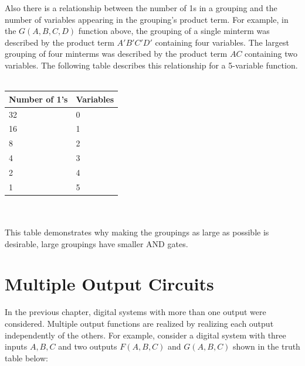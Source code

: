 \begin{process:minimizationKmap}
Also there is a relationship between the number of 1s in a 
grouping and the number of variables appearing in the grouping's
product term.  For example, in the $G(A,B,C,D)$ function
above, the grouping of a single minterm was described by the
product term $A'B'C'D'$ containing four variables.  The largest
grouping of four  minterms was described by the product term
$AC$ containing two variables.  The following table describes 
this relationship for a 5-variable function.
\\ \\
\begin{tabular}{l|l}
Number of 1's	& Variables  \\ \hline
32		&	0	\\ \hline
16		&	1	\\ \hline
8		&	2	\\ \hline
4		&	3	\\ \hline
2		&	4	\\ \hline
1		&	5	\\ 
\end{tabular}
\\ \\
This table demonstrates why making the groupings as large
as possible is desirable, large groupings have smaller AND gates.

\section{Multiple Output Circuits}
In the previous chapter, digital systems with more than one output 
were considered.  Multiple output functions are realized by
realizing each output independently of the others. For example, 
consider a digital system with three inputs $A,B,C$ and two outputs 
$F(A,B,C)$ and $G(A,B,C)$ shown in the truth table below:



\end{process:minimizationKmap}
